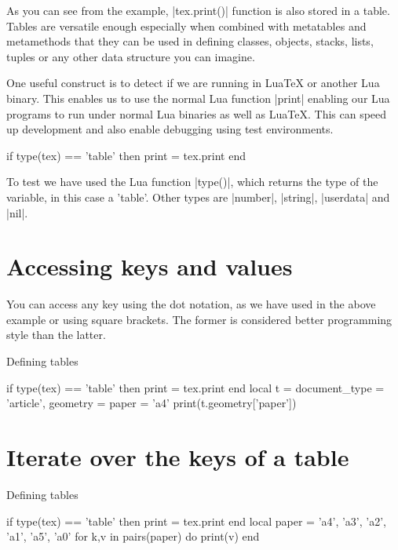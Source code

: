 As you can see from the example, |tex.print()| function is also stored in a table. Tables are versatile enough especially when combined with metatables and metamethods that they can be used in defining classes, objects,  stacks, lists, tuples or any other data structure you can imagine. 

One useful construct is to detect if we are running in LuaTeX or another Lua binary. This enables us to use the normal Lua function |print|  enabling our Lua programs to run under normal Lua binaries as well as LuaTeX. This can speed up development and also enable debugging using test environments.

\begin{scriptexample}{}{}
\begin{teX}
  if type(tex) == 'table' then print = tex.print end
\end{teX}
\end{scriptexample}

To test we have used the Lua function |type()|, which returns the type of the variable, in this case a 'table'. Other types are |number|, |string|, |userdata| and |nil|. 

\section{Accessing keys and values}

You can access any key using the dot notation, as we have used in the above example or using square brackets. The former is considered better programming style than the latter.

\begin{texexample}{Defining tables}{}
\begin{luacode}
if type(tex) == 'table' then print = tex.print end
local t = {
    document_type = {'article'},
    geometry = {
       paper = 'a4'
     }
  } 
 print(t.geometry['paper'])
\end{luacode}
\end{texexample}

\section{Iterate over the keys of a table}

\begin{texexample}{Defining tables}{}
\begin{luacode}
if type(tex) == 'table' then print = tex.print end
local paper = {'a4', 'a3', 'a2', 'a1', 'a5', 'a0' }
for k,v in pairs(paper) do
   print(v)
end
\end{luacode}
\end{texexample}


